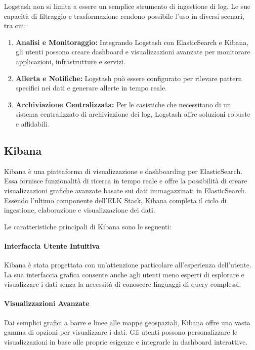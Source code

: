 Logstash non si limita a essere un semplice strumento di ingestione di log. Le sue capacità di filtraggio e trasformazione rendono possibile l'uso in diversi scenari, tra cui:

\begin{enumerate}
\item \textbf{Analisi e Monitoraggio:} Integrando Logstash con ElasticSearch e Kibana, gli utenti possono creare dashboard e visualizzazioni avanzate per monitorare applicazioni, infrastrutture e servizi.
\item \textbf{Allerta e Notifiche:} Logstash può essere configurato per rilevare pattern specifici nei dati e generare allerte in tempo reale.
\item \textbf{Archiviazione Centralizzata:} Per le casistiche che necessitano di un sistema centralizzato di archiviazione dei log, Logstash offre soluzioni robuste e affidabili.
\end{enumerate}

\subsection{Kibana}

Kibana è una piattaforma di visualizzazione e dashboarding per ElasticSearch. Essa fornisce funzionalità di ricerca in tempo reale e offre la possibilità di creare visualizzazioni grafiche avanzate basate sui dati immagazzinati in ElasticSearch. Essendo l'ultimo componente dell'ELK Stack, Kibana completa il ciclo di ingestione, elaborazione e visualizzazione dei dati.

Le caratteristiche principali di Kibana sono le seguenti:

\paragraph{Interfaccia Utente Intuitiva}

Kibana è stata progettata con un'attenzione particolare all'esperienza dell'utente. La sua interfaccia grafica consente anche agli utenti meno esperti di esplorare e visualizzare i dati senza la necessità di conoscere linguaggi di query complessi.

\paragraph{Visualizzazioni Avanzate}

Dai semplici grafici a barre e linee alle mappe geospaziali, Kibana offre una vasta gamma di opzioni per visualizzare i dati. Gli utenti possono personalizzare le visualizzazioni in base alle proprie esigenze e integrarle in dashboard interattive.

